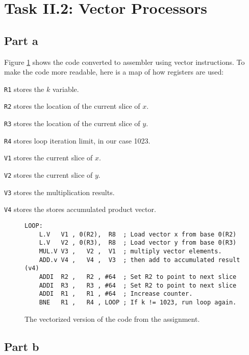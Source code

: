 \section{Task II.2: Vector Processors}

\subsection{Part a}
Figure \ref{fig:t22acode} shows the code converted to assembler using vector
instructions. To make the code more readable, here is a map of how registers are
used:
\begin{itemize*}
    \item[\texttt{R1}] stores the $k$ variable.
    \item[\texttt{R2}] stores the location of the current slice of $x$.
    \item[\texttt{R3}] stores the location of the current slice of $y$.
    \item[\texttt{R4}] stores loop iteration limit, in our case 1023.
    \item[\texttt{V1}] stores the current slice of $x$.
    \item[\texttt{V2}] stores the current slice of $y$.
    \item[\texttt{V3}] stores the multiplication results.
    \item[\texttt{V4}] stores the stores accumulated product vector.
\end{itemize*}


\begin{figure}
    \begin{lstlisting}[language={[x86masm]Assembler}]
LOOP:
    L.V   V1 , 0(R2),  R8  ; Load vector x from base 0(R2)
    L.V   V2 , 0(R3),  R8  ; Load vector y from base 0(R3)
    MUL.V V3 ,   V2 ,  V1  ; multiply vector elements.
    ADD.v V4 ,   V4 ,  V3  ; then add to accumulated result (v4)
    ADDI  R2 ,   R2 , #64  ; Set R2 to point to next slice
    ADDI  R3 ,   R3 , #64  ; Set R2 to point to next slice
    ADDI  R1 ,   R1 , #64  ; Increase counter.
    BNE   R1 ,   R4 , LOOP ; If k != 1023, run loop again.
    \end{lstlisting}
    \caption{The vectorized version of the code from the assignment.}
    \label{fig:t22acode}
\end{figure}

\subsection{Part b}

